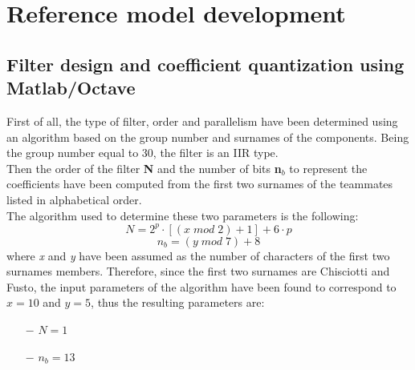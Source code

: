 \documentclass[a4paper, titlepage]{article}
\begin{document}
\section{Reference model development}
\subsection{Filter design and coefficient quantization using Matlab/Octave}
First of all, the type of filter, order and parallelism have been determined using an algorithm based on the group number and surnames of the components. Being the group number equal to 30, the filter is an IIR type.\\
Then the order of the filter \textbf{N} and the number of bits \textbf{n$_{b}$} to represent the coefficients have been computed from the first two surnames of the teammates listed in alphabetical order. \\The algorithm used to determine these two parameters is the following:
\begin{equation}
    N=2^{p}\cdot[(x\; mod\; 2)+1]+6\cdot p
\end{equation}
\begin{equation}
    n_{b}= (y\; mod\; 7) + 8
\end{equation}
where \textit{x} and \textit{y} have been assumed as the number of characters of the first two surnames members. Therefore, since the first two surnames are Chisciotti and Fusto, the input parameters of the algorithm have been found to correspond to $x=10$ and $y=5$, thus the resulting parameters are:
\begin{itemize}
    \item [$-$] $N=1$
    \item [$-$] $n_{b}=13$
\end{itemize}

\newpage
\end{document}
